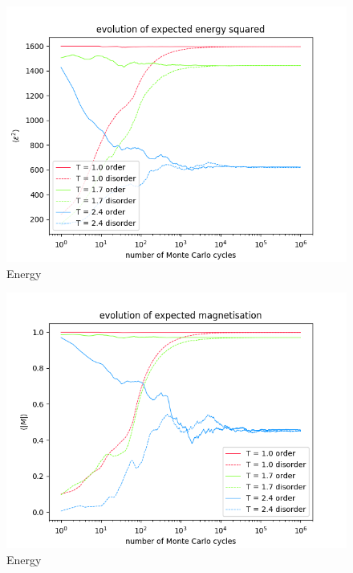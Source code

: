 \documentclass[nofootinbib,reprint,english]{revtex4-1}
\begin{document}
\begin{figure}
\centering
\includegraphics[scale=0.5]{../output/figures/experiment2/energy2.png}
\caption{Energy}\label{fig:experiment2_energy2}
\end{figure}

\begin{figure}
\centering
\includegraphics[scale=0.5]{../output/figures/experiment2/magnetisation.png}
\caption{Energy}\label{fig:experiment2_magnetisation}
\end{figure}
\end{document}
